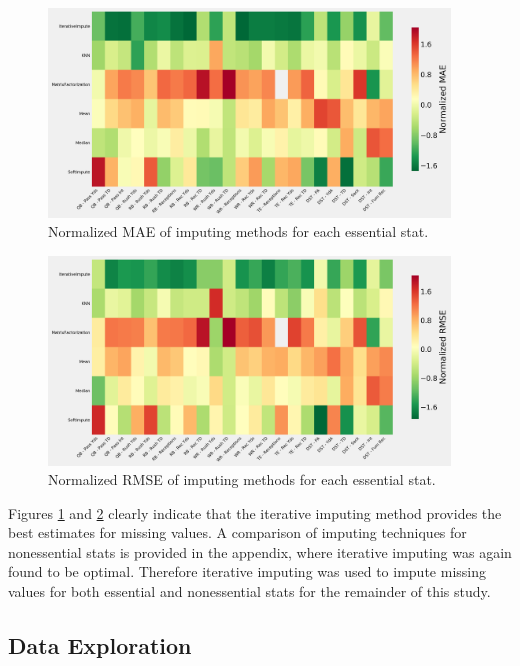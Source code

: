 \documentclass[12pt]{article}
\begin{document}
\begin{figure}[H]
  \centering
  \includegraphics[width=0.95\textwidth]{../figures/impute_MAE}
  \caption{Normalized MAE of imputing methods for each essential stat.}
  \label{impute MAE}
\end{figure}

\begin{figure}[H]
  \centering
  \includegraphics[width=0.95\textwidth]{../figures/impute_RMSE}
  \caption{Normalized RMSE of imputing methods for each essential stat.}
  \label{impute RMSE}
\end{figure}

Figures \ref{impute MAE} and \ref{impute RMSE} clearly indicate that the iterative imputing method provides the best estimates for missing values.  A comparison of imputing techniques for nonessential stats is provided in the appendix, where iterative imputing was again found to be optimal. Therefore iterative imputing was used to impute missing values for both essential and nonessential stats for the remainder of this study.

\subsection{Data Exploration}
\end{document}
